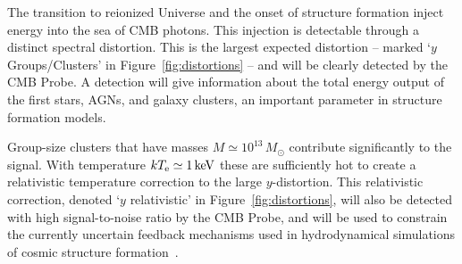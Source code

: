 The transition to reionized Universe and the onset of structure formation inject
energy into the sea of CMB photons. This injection is detectable through a distinct spectral distortion. 
This is the largest expected distortion -- marked `$y$ Groups/Clusters' in Figure~\ref{fig:distortions} --
and will be clearly detected by the CMB Probe. 
A detection will give information about the total energy output of the first stars, AGNs, and galaxy clusters, 
an important parameter in structure formation models. 

Group-size clusters that have masses $M\simeq 10^{13}\,M_{\odot}$ contribute significantly to the signal. 
With temperature $k T_{\rm e}\simeq 1\,{\rm keV}$ these are sufficiently hot to create a relativistic 
temperature correction to the large $y$-distortion. This relativistic correction, denoted `$y$ relativistic' in 
Figure~\ref{fig:distortions},  will also be detected with high signal-to-noise ratio by the CMB Probe, and 
will be used to constrain the currently uncertain feedback mechanisms used in hydrodynamical simulations
of cosmic structure formation~\citep{Hill2015}. 


